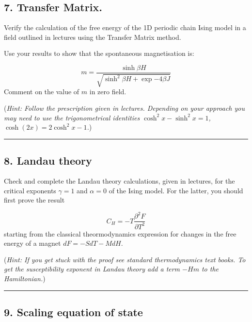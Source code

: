 \documentclass[
  letterpaper,
  enabledeprecatedfontcommands]{report}
\begin{document}
\subsection*{7. Transfer Matrix.}\label{transfer-matrix.}

Verify the calculation of the free energy of the 1D periodic chain Ising
model in a field outlined in lectures using the Transfer Matrix method.

Use your results to show that the spontaneous magnetisation is:

\[m=\frac{\sinh \beta H}{\sqrt{\sinh^2\beta H+\exp{-4\beta J}}}\]
Comment on the value of \(m\) in zero field.

(\emph{Hint: Follow the prescription given in lectures. Depending on
your approach you may need to use the trigonometrical identities
\(\cosh^2x-\sinh^2x=1\), \(\cosh(2x)=2\cosh^2x-1\).})

\begin{center}\rule{0.5\linewidth}{0.5pt}\end{center}

\subsection*{8. Landau theory}\label{landau-theory}

Check and complete the Landau theory calculations, given in lectures,
for the critical exponents \(\gamma=1\) and \(\alpha=0\) of the Ising
model. For the latter, you should first prove the result

\[C_H =-T\frac{\partial^2 F}{\partial T^2}\] starting from the classical
theormodynamics expression for changes in the free energy of a magnet
\(dF=-SdT-MdH\).

(\emph{Hint: If you get stuck with the proof see standard thermodynamics
text books. To get the susceptibility exponent in Landau theory add a
term \(-Hm\) to the Hamiltonian.})

\begin{center}\rule{0.5\linewidth}{0.5pt}\end{center}

\subsection*{9. Scaling equation of
state}\label{scaling-equation-of-state}
\end{document}
